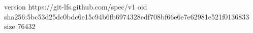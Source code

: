 version https://git-lfs.github.com/spec/v1
oid sha256:5bc53d25dc0bdc6e15c94b6fb6974328edf708bf66e6e7e62981e521f0136833
size 76432

